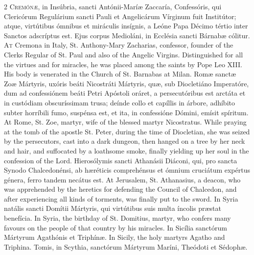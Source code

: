 \begin{paracol}{2}
\lettrine[lines=2]{C}{remónæ,} in Insúbria, 
 sancti Antónii-Maríæ Zaccaría, Confessóris, qui Clericórum Regulárium sancti 
 Pauli et Angelicárum Vírginum fuit Institútor; atque, virtútibus ómnibus et 
 miráculis insígnis, a Leóne Papa Décimo tértio inter Sanctos adscríptus est. 
 Ejus corpus Medioláni, in Ecclésia sancti Bárnabæ cólitur.
\switchcolumn
{}
\lettrine[lines=2]{A}{t} Cremona in Italy, St. 
 Anthony-Mary Zacharias, confessor, founder of the Clerks Regular of St. Paul 
 and also of the Angelic Virgins. Distinguished for all the virtues and 
 for miracles, he was placed among the saints by Pope Leo XIII. His 
 body is venerated in the Church of St. Barnabas at Milan.
\switchcolumn*
{}
Romæ sanctæ Zoæ 
 Mártyris, uxóris beáti Nicostráti Mártyris, quæ, sub Diocletiáno Imperatóre, 
 dum ad confessiónem beáti Petri Apóstoli oráret, a persecutóribus est 
 arctáta et in custódiam obscuríssimam trusa; deínde collo et capíllis in 
 árbore, adhíbito subter horríbili fumo, suspénsa est, et ita, in confessióne 
 Dómini, emísit spíritum.
\switchcolumn
{}
At Rome, St. Zoe, martyr, wife of 
 the blessed martyr Nicostratus. While praying at the tomb of the 
 apostle St. Peter, during the time of Diocletian, she was seized by the 
 persecutors, cast into a dark dungeon, then hanged on a tree by her neck and 
 hair, and suffocated by a loathsome smoke, finally yielding up her soul in 
 the confession of the Lord.
\switchcolumn*
{}
Hierosólymis sancti 
 Athanásii Diáconi, qui, pro sancta Synodo Chalcedonénsi, ab hæréticis 
 comprehénsus et ómnium cruciátum expértus génera, ferro tandem necátus est.
\switchcolumn
{}
At Jerusalem, St. Athanasius, a 
 deacon, who was apprehended by the heretics for defending the Council of 
 Chalcedon, and after experiencing all kinds of torments, was finally put to 
 the sword.
\switchcolumn*
{}
In Syria natális 
 sancti Domítii Mártyris, qui virtútibus suis multa íncolis præstat benefícia.
\switchcolumn
{}
In Syria, the birthday of St. 
 Domitius, martyr, who confers many favours on the people of that country by 
 his miracles.
\switchcolumn*
{}
In Sicília sanctórum 
 Mártyrum Agathónis et Triphínæ.
\switchcolumn
{}
In Sicily, the holy martyrs Agatho 
 and Triphina.
\switchcolumn*
{}
Tomis, in Scythia, 
 sanctórum Mártyrum Maríni, Theódoti et Sédophæ.

\end{paracol}
